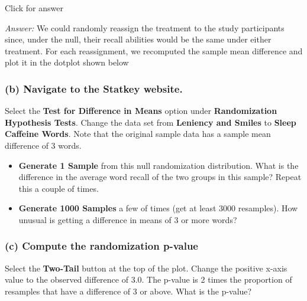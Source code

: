 \documentclass[
]{book}
\providecommand{\tightlist}{%
  \setlength{\itemsep}{0pt}\setlength{\parskip}{0pt}}
\begin{document}
Click for answer

\emph{Answer:} We could randomly reassign the treatment to the study participants since, under the null, their recall abilities would be the same under either treatment. For each reassignment, we recomputed the sample mean difference and plot it in the dotplot shown below

\hypertarget{b-navigate-to-the-statkey-website.-1}{%
\subsubsection{(b) Navigate to the Statkey website.}\label{b-navigate-to-the-statkey-website.-1}}

Select the \textbf{Test for Difference in Means} option under \textbf{Randomization Hypothesis Tests}. Change the data set from \textbf{Leniency and Smiles} to \textbf{Sleep Caffeine Words}. Note that the original sample data has a sample mean difference of 3 words.

\begin{itemize}
\tightlist
\item
  \textbf{Generate 1 Sample} from this null randomization distribution. What is the difference in the average word recall of the two groups in this sample? Repeat this a couple of times.
\item
  \textbf{Generate 1000 Samples} a few of times (get at least 3000 resamples). How unusual is getting a difference in means of 3 or more words?
\end{itemize}

\vspace*{.5in}

\hypertarget{c-compute-the-randomization-p-value-1}{%
\subsubsection{(c) Compute the randomization p-value}\label{c-compute-the-randomization-p-value-1}}

Select the \textbf{Two-Tail} button at the top of the plot. Change the positive x-axis value to the observed difference of 3.0. The p-value is 2 times the proportion of resamples that have a difference of 3 or above. What is the p-value?
\end{document}
